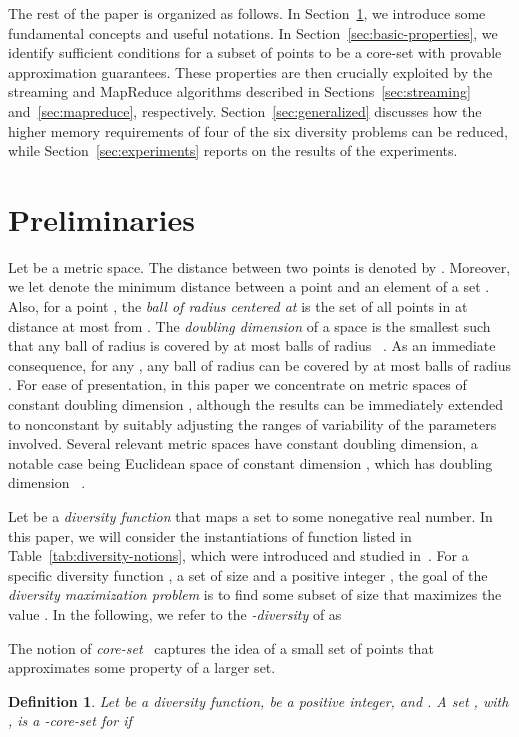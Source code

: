 \documentclass{article}
\newtheorem{definition}{Definition}
\begin{document}
The rest of the paper is organized as follows.  In
Section~\ref{sec:preliminaries}, we introduce some fundamental
concepts and useful notations. In Section~\ref{sec:basic-properties},
we identify sufficient conditions for a subset of points to be a
core-set with provable approximation guarantees. These properties are
then crucially exploited by the streaming and MapReduce algorithms
described in Sections~\ref{sec:streaming} and~\ref{sec:mapreduce},
respectively. Section~\ref{sec:generalized} discusses how the higher
memory requirements of four of the six diversity problems can be
reduced, while Section~\ref{sec:experiments} reports on the results of
the experiments.

\section{Preliminaries} \label{sec:preliminaries}

Let  be a metric space. The distance between two points
 is denoted by .  Moreover, we let
 denote the minimum distance between a
point  and an element of a set . Also,
for a point , the \emph{ball of radius  centered at
  } is the set of all points in  at distance at most 
from .
The \emph{doubling dimension} of a space is the smallest  such
that any ball of radius  is covered by  at most  balls of radius
~\cite{GuptaKL03}. As an immediate consequence, for any 
, any ball of radius  can be covered by at most  balls
of radius . 
For ease of presentation, in this paper we concentrate on metric
spaces of constant doubling dimension , although the results can be
immediately extended to nonconstant  by suitably adjusting the
ranges of variability of the parameters involved. Several relevant
metric spaces have constant doubling dimension, a notable case being 
Euclidean space of  constant dimension , which has doubling dimension
~\cite{GuptaKL03}.

Let  be a \emph{diversity
  function} that maps a set  to some nonegative real
number.
In this paper, we will consider the instantiations of function
 listed in Table~\ref{tab:diversity-notions}, which were
introduced and studied in~\cite{ChandraH01,IndykMMM14,AghamolaeiFZ15}.
For a specific diversity function , a set  of size  and a positive integer , 
the goal of the \emph{diversity
  maximization problem} is to find some subset  of size
 that maximizes the value . In the following, we
refer to the \emph{-diversity} of  as


The notion of \emph{core-set}~\cite{AgarwalHV05} captures the idea of
a small set of points that approximates some property of a larger
set.
\begin{definition}\label{def:composable}
Let  be a diversity function,  be a positive
  integer, and . A set , with , is a {\em -core-set} for  if
  
\end{definition}
\end{document}
